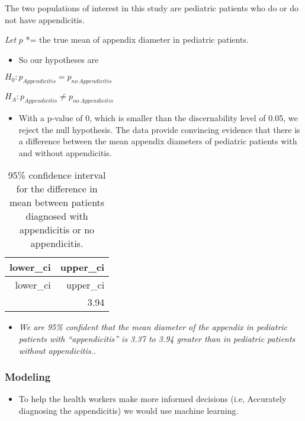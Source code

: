 \documentclass[
]{article}
\providecommand{\tightlist}{%
  \setlength{\itemsep}{0pt}\setlength{\parskip}{0pt}}
\begin{document}
The two populations of interest in this study are pediatric patients who
do or do not have appendicitis.

\emph{Let} \(p\) *= the true mean of appendix diameter in pediatric
patients.

\begin{itemize}
\tightlist
\item
  So our hypotheses are
\end{itemize}

\(H_0: p_{Appendicitis} = p_{no~Appendicitis}\)

\(H_A: p_{Appendicitis} \ne p_{no~Appendicitis}\)

\begin{itemize}
\tightlist
\item
  With a p-value of 0, which is smaller than the discernability level of
  0.05, we reject the null hypothesis. The data provide convincing
  evidence that there is a difference between the mean appendix
  diameters of pediatric patients with and without appendicitis.
\end{itemize}

\begin{longtable}[]{@{}rr@{}}
\caption{95\% confidence interval for the difference in mean between
patients diagnosed with appendicitis or no appendicitis.}\tabularnewline
\toprule\noalign{}
lower\_ci & upper\_ci \\
\midrule\noalign{}
\endfirsthead
\toprule\noalign{}
lower\_ci & upper\_ci \\
\midrule\noalign{}
\endhead
\bottomrule\noalign{}
\endlastfoot
3.37 & 3.94 \\
\end{longtable}

\begin{itemize}
\tightlist
\item
  \emph{We are 95\% confident that the mean diameter of the appendix in
  pediatric patients with ``appendicitis'' is 3.37 to 3.94 greater than
  in pediatric patients without appendicitis..}
\end{itemize}

\subsubsection{Modeling}\label{modeling}

\begin{itemize}
\tightlist
\item
  To help the health workers make more informed decisions (i.e,
  Accurately diagnosing the appendicitis) we would use machine learning.
\end{itemize}
\end{document}
